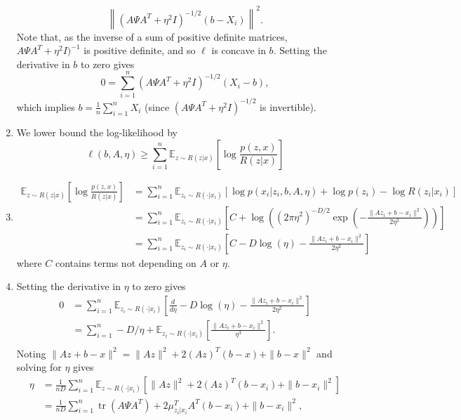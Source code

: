 \documentclass[11pt]{article}
\newcommand{\inv}{^{-1}}
\newcommand{\E}{\mathbb{E}} %
\newcommand{\tr}{\operatorname{tr}} %
\begin{document}
\begin{enumerate}
\[                        \left\|(A \Psi A^T + \eta^2 I)^{-1/2}(b - X_i)\right\|^2.
\]
Note that, as the inverse of a sum of positive definite matrices,
$A \Psi A^T + \eta^2 I)\inv$ is positive definite, and so $\ell$ is concave in
$b$. Setting the derivative in $b$ to zero gives
\[0
    = \sum_{i = 1}^n (A \Psi A^T + \eta^2 I)^{-1/2} (X_i - b),
\]
which implies $b = \frac{1}{n} \sum_{i = 1}^n X_i$ (since
$(A \Psi A^T + \eta^2 I)^{-1/2}$ is invertible).
\item We lower bound the log-likelihood by
\[\ell(b,A,\eta)
    \geq \sum_{i = 1}^n \E_{z \sim R(z | x)}\left[ \log \frac{p(z, x)}{R(z | x)} \right]
\]
\item
\begin{align*}
\E_{z \sim R(z | x)}\left[ \log \frac{p(z, x)}{R(z | x)} \right]
 &  = \sum_{i = 1}^n \E_{z_i \sim R( \cdot | x_i)}
        \left[ \log p(x_i | z_i, b, A, \eta) + \log p(z_i)
                                                - \log R(z_i | x_i) \right] \\
 &  = \sum_{i = 1}^n \E_{z_i \sim R( \cdot | x_i)}
        \left[ C + \log \left( (2\pi\eta^2)^{-D/2}
            \exp \left( -\frac{\|Az_i + b - x_i\|^2}{2\eta^2} \right) 
                                                            \right) \right] \\
 &  = \sum_{i = 1}^n \E_{z_i \sim R( \cdot | x_i)}
        \left[ C - D\log(\eta) - \frac{\|Az_i + b - x_i\|^2}{2\eta^2} \right]
\end{align*}
where $C$ contains terms not depending on $A$ or $\eta$.
\item Setting the derivative in $\eta$ to zero gives
\begin{align*}
0
 &  = \sum_{i = 1}^n \E_{z_i \sim R( \cdot | x_i)}
        \left[ \frac{d}{d\eta} -D\log(\eta)
                            - \frac{\|Az_i + b - x_i\|^2}{2\eta^2} \right]  \\
 &  = \sum_{i = 1}^n -D/\eta + \E_{z_i \sim R( \cdot | x_i)}
        \left[ \frac{\|Az_i + b - x_i\|^2}{\eta^3} \right].  \\
\end{align*}
Noting $\|Az + b - x\|^2 = \|Az\|^2 + 2(Az)^T(b - x) + \|b - x\|^2$ and solving
for $\eta$ gives
\begin{align*}
\eta
 &  = \frac{1}{nD} \sum_{i = 1}^n \E_{z \sim R( \cdot | x_i)}
                        [\|Az\|^2 + 2(Az)^T(b - x_i) + \|b - x_i\|^2] \\
 &  = \frac{1}{nD} \sum_{i = 1}^n \tr(A \Psi A^T)
    + 2\mu_{z_i|x_i}^T A^T(b - x_i) + \|b - x_i\|^2,
\end{align*}

\end{enumerate}
\end{document}

